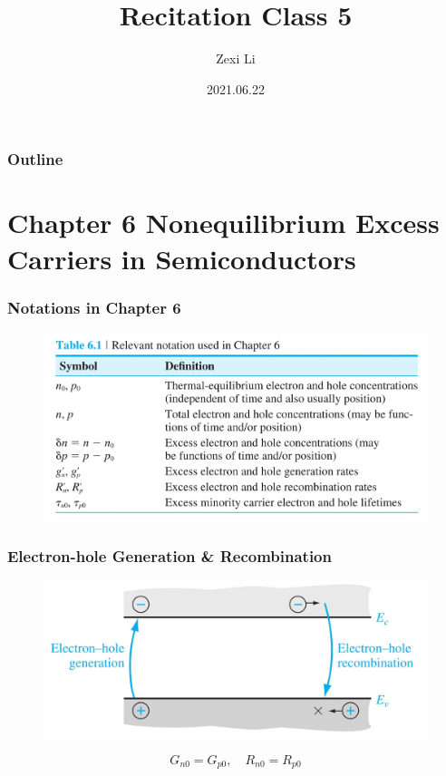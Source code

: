 \documentclass{beamer}
\begin{document}
\renewcommand{\d}{\: \mathrm{d} }
\newcommand{\e}{\mathrm{e}}


\title[] {Recitation Class 5}

\author[lzx]{Zexi Li}


\date{2021.06.22}

\frame{\titlepage}


\begin{frame}
    \frametitle{Outline}
    \tableofcontents
\end{frame}

\section{Chapter 6 Nonequilibrium Excess Carriers in Semiconductors}
    \begin{frame} \frametitle{Notations in Chapter 6}
        \begin{figure}[H]
            \centering
            \includegraphics[width=0.9\linewidth]{Notations.jpg}
            \label{fig:Notations.jpg}
        \end{figure}
    \end{frame}
    \begin{frame} \frametitle{Electron-hole Generation \& Recombination}
        \begin{figure}[H]
            \centering
            \includegraphics[width=0.6\linewidth]{Generation-recombination.jpg}
            \label{fig:Generation-recombination.jpg}
        \end{figure}
        \begin{equation*}
            G_{n0} = G_{p0}, \quad R_{n0} = R_{p0}
        \end{equation*}
    \end{frame}
\end{document}

